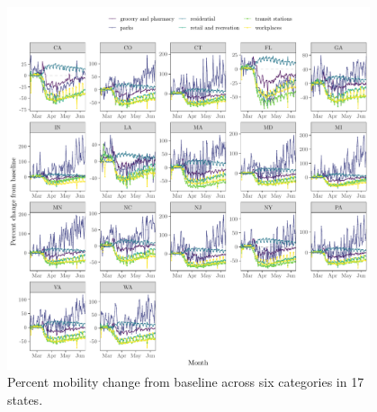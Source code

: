 \begin{figure}[t!]
\begin{center}
\includegraphics[width=0.95\textwidth]{deaths/mobility.pdf}
\caption{Percent mobility change from baseline across six categories in 17 states.
\label{fig.supp_mobility}}
\end{center}
\end{figure}

